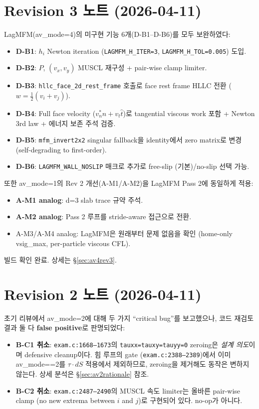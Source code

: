 \documentclass[11pt]{article}
\begin{document}
\newpage

\section*{Revision 3 노트 (2026-04-11)}

LagMFM(av\_mode=4)의 미구현 기능 6개(D-B1--D-B6)를 모두 보완하였다:
\begin{itemize}
  \item \textbf{D-B1}: $h_i$ Newton iteration (\texttt{LAGMFM\_H\_ITER=3},
    \texttt{LAGMFM\_H\_TOL=0.005}) 도입.
  \item \textbf{D-B2}: $P$, $(v_x, v_y)$ MUSCL 재구성 + pair-wise clamp limiter.
  \item \textbf{D-B3}: \texttt{hllc\_face\_2d\_rest\_frame} 호출로 face rest
    frame HLLC 전환 ($w = \tfrac12(v_i+v_j)$).
  \item \textbf{D-B4}: Full face velocity ($v_n^*\hat n + v_t\hat t$)로
    tangential viscous work 포함 + Newton 3rd law + 에너지 보존 주석 검증.
  \item \textbf{D-B5}: \texttt{mfm\_invert2x2} singular fallback을 identity에서
    zero matrix로 변경 (self-degrading to first-order).
  \item \textbf{D-B6}: \texttt{LAGMFM\_WALL\_NOSLIP} 매크로 추가로 free-slip
    (기본)/no-slip 선택 가능.
\end{itemize}

또한 av\_mode=1의 Rev 2 개선(A-M1/A-M2)을 LagMFM Pass 2에 동일하게 적용:
\begin{itemize}
  \item \textbf{A-M1 analog}: d=3 slab trace 규약 주석.
  \item \textbf{A-M2 analog}: Pass 2 루프를 stride-aware 접근으로 전환.
  \item A-M3/A-M4 analog: LagMFM은 원래부터 문제 없음을 확인 (home-only
    vsig\_max, per-particle viscous CFL).
\end{itemize}

빌드 확인 완료. 상세는 §\ref{sec:av4rev3}.

\newpage

\section*{Revision 2 노트 (2026-04-11)}

초기 리뷰에서 av\_mode=2에 대해 두 가지 ``critical bug''를 보고했으나,
코드 재검토 결과 둘 다 \textbf{false positive}로 판명되었다:
\begin{itemize}
  \item \textbf{B-C1 취소}: \texttt{exam.c:1668--1673}의
    \texttt{tauxx=tauxy=tauyy=0} zeroing은 \emph{설계 의도}이며
    defensive cleanup이다. 힘 루프의 gate (\texttt{exam.c:2388--2389})에서
    이미 av\_mode==2를 $\tau\cdot dS$ 적용에서 제외하므로, zeroing을 제거해도
    동작은 변하지 않는다. 상세 분석은 §\ref{sec:av2rationale} 참조.
  \item \textbf{B-C2 취소}: \texttt{exam.c:2487--2490}의 MUSCL 속도 limiter는
    올바른 pair-wise clamp (no new extrema between $i$ and $j$)로 구현되어 있다.
    no-op가 아니다.
\end{itemize}
\end{document}
